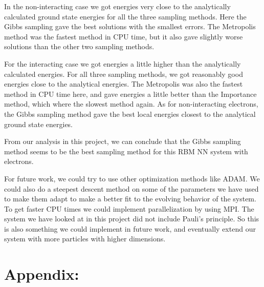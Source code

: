 \documentclass[12pt,a4paper,english]{article}
\begin{document}
In the non-interacting case we got energies very close to the analytically calculated ground state energies for all the three sampling methods. Here the Gibbs sampling gave the best solutions with the smallest errors. The Metropolis method was the fastest method in CPU time, but it also gave slightly worse solutions than the other two sampling methods.

For the interacting case we got energies a little higher than the analytically calculated energies. For all three sampling methods, we got reasonably good energies close to the analytical energies. The Metropolis was also the fastest method in CPU time here, and gave energies a little better than the Importance method, which where the slowest method again. As for non-interacting electrons, the Gibbs sampling method gave the best local energies closest to the analytical ground state energies. 

From our analysis in this project, we can conclude that the Gibbs sampling method seems to be the best sampling method for this RBM NN system with electrons.

For future work, we could try to use other optimization methods like ADAM. We could also do a steepest descent method on some of the parameters we have used to make them adapt to make a better fit to the evolving behavior of the system. To get faster CPU times we could implement parallelization by using MPI. The system we have looked at in this project did not include Pauli's principle. So this is also something we could implement in future work, and eventually extend our system with more particles with higher dimensions.

\appendix
\section*{Appendix:}
\end{document}
